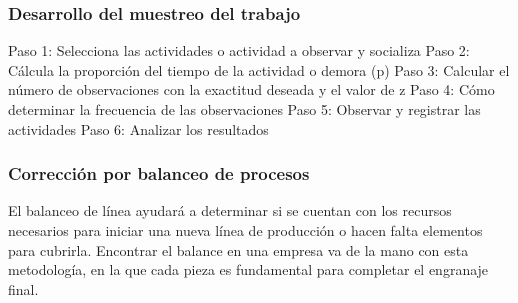     \subsubsection{Desarrollo del muestreo del trabajo}
    Paso 1: Selecciona las actividades o actividad a observar y socializa
    Paso 2: Cálcula la proporción del tiempo de la actividad o demora (p)
    Paso 3: Calcular el número de observaciones con la exactitud deseada y el valor de z
    Paso 4: Cómo determinar la frecuencia de las observaciones
    Paso 5: Observar y registrar las actividades
    Paso 6: Analizar los resultados
    \cite{muestreodeltrabajo}
    \subsubsection{Corrección por balanceo de procesos}
    El balanceo de línea ayudará a determinar si se cuentan con los recursos necesarios para iniciar una nueva línea de producción o hacen falta elementos para cubrirla. Encontrar el balance en una empresa va de la mano con esta metodología, en la que cada pieza es fundamental para completar el engranaje final.
    \cite{Balanceodelineas}
